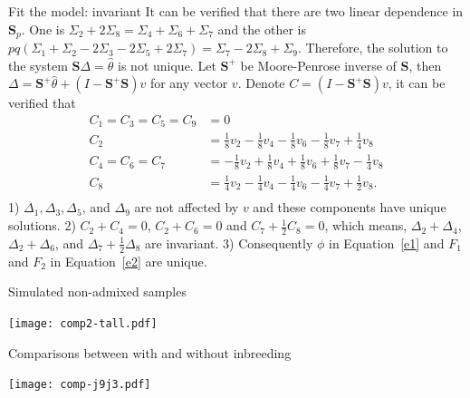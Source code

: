 \documentclass[]{beamer}
\def\S{{\mathbf{S}}}
\begin{document}
\begin{frame}{Fit the model: invariant}
It can be verified that there are two linear dependence in $\S_p$. One is  $\Sigma_2 + 2 \Sigma_8 = \Sigma_4 + \Sigma_6 + \Sigma_7$ and the other is $pq (\Sigma_1+\Sigma_2- 2\Sigma_3 - 2\Sigma_5 + 2\Sigma_7)  =  \Sigma_7 - 2 \Sigma_8 +  \Sigma_9$. Therefore, the solution to the system $\S \Delta = \hat\theta$ is not unique. Let $\S^{+}$ be Moore-Penrose inverse of $\S$, then $\Delta = \S^{+} \hat\theta + (I - \S^{+} \S) v$ for any vector $v$.  Denote $C = (I - \S^{+} \S) v$,  it can be verified that  
\begin{equation}\label{C}
\begin{aligned}
C_1 =C_3=C_5=C_9 &= 0 \\
C_2  &=  \frac{1}{8} v_2 -  \frac{1}{8} v_4 -  \frac{1}{8} v_6 -  \frac{1}{8} v_7 +  \frac{1}{4} v_8 \\  
C_4 =  C_6 = C_7 &=  - \frac{1}{8} v_2 +  \frac{1}{8} v_4 +  \frac{1}{8} v_6 +  \frac{1}{8} v_7 -  \frac{1}{4} v_8 \\
  C_8 &= \frac{1}{4} v_2 - \frac{1}{4}  v_4 - \frac{1}{4}  v_6 - \frac{1}{4}  v_7 + \frac{1}{2}  v_8. \\
\end{aligned}
\end{equation}
1)  $\Delta_1, \Delta_3, \Delta_5$, and $\Delta_9$ are not affected by $v$ and these components have unique solutions. 2) $C_2 + C_4 = 0$, $C_2+C_6 = 0$ and $C_7 + \frac{1}{2}C_8 = 0$, which means,  $\Delta_2+\Delta_4 $, $\Delta_2+\Delta_6$, and  $\Delta_7 + \frac{1}{2}\Delta_8$ are invariant. 3) Consequently $\phi$ in Equation~\eqref{e1} and $F_1$ and $F_2$ in Equation~\eqref{e2} are unique. 
\end{frame}


\begin{frame}{Simulated non-admixed samples}
\begin{center}
\texttt{[image: comp2-tall.pdf]}
\end{center}
\end{frame}

\begin{frame}{Comparisons between with and without inbreeding}
\begin{center}
\texttt{[image: comp-j9j3.pdf]}
\end{center}
\end{frame}
\end{document}
